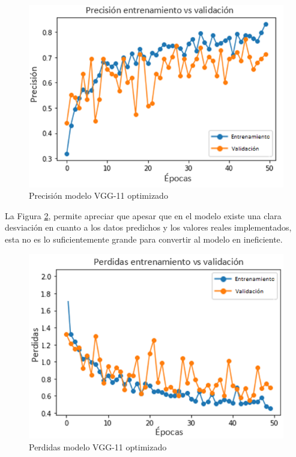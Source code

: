 \begin{figure}[ht]
	\centering
	\includegraphics[scale=0.6]{Figs/508.png}
	\caption{Precisión modelo VGG-11 optimizado}
	\label{fig:preci_vgg11_OPT}
\end{figure}

La Figura \ref{fig:perdda_vgg11_opt}, permite apreciar que apesar que en el modelo existe una clara desviación en cuanto a los datos predichos y los valores reales implementados, esta no es lo suficientemente grande para convertir al modelo en ineficiente.

\newpage
\begin{figure}[ht]
	\centering
	\includegraphics[scale=0.6]{Figs/509.png}
	\caption{Perdidas modelo VGG-11 optimizado}
	\label{fig:perdda_vgg11_opt}
\end{figure}


